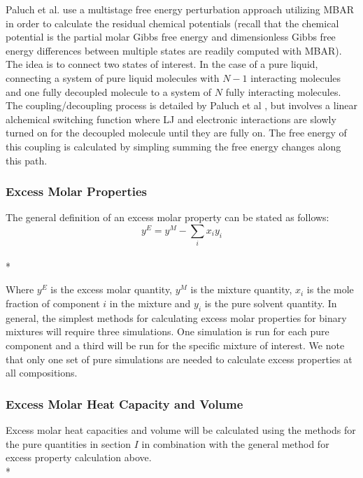 \documentclass[9pt,bestpractices]{livecoms}
\begin{document}
Paluch et al. use a multistage free energy perturbation approach utilizing MBAR in order to calculate the residual chemical potentials (recall that the chemical potential is the partial molar Gibbs free energy and dimensionless Gibbs free energy differences between multiple states are readily computed with MBAR). The idea is to connect two states of interest. In the case of a pure liquid, connecting a system of pure liquid molecules with $N - 1$ interacting molecules and one fully decoupled molecule to a system of $N$ fully interacting molecules. The coupling/decoupling process is detailed by Paluch et al \cite{paluch0}, but involves a linear alchemical switching function where LJ and electronic interactions are slowly turned on for the decoupled molecule until they are fully on. The free energy of this coupling is calculated by simpling summing the free energy changes along this path.     


\subsubsection{Excess Molar Properties}
The general definition of an excess molar property can be stated as follows:
\begin{equation}y^{E} = y^{M} - \sum_{i} x_i y_i\end{equation}\\*

Where $y^E$ is the excess molar quantity, $y^M$ is the mixture quantity, $x_i$ is the mole fraction of component $i$ in the mixture and $y_i$ is the pure solvent quantity. In general, the simplest methods for calculating excess molar properties for binary mixtures will require three simulations. One simulation is run for each pure component and a third will be run for the specific mixture of interest.
We note that only one set of pure simulations are needed to calculate excess properties at all compositions.


\subsubsection{Excess Molar Heat Capacity and Volume}
Excess molar heat capacities and volume will be calculated using the  methods for the pure quantities in section $I$ in combination with the general method for excess property calculation above.\\*
\end{document}
